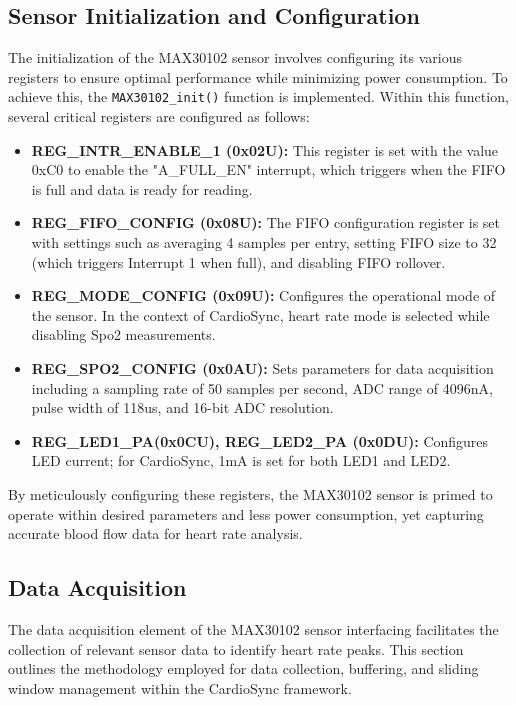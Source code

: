 \subsection{Sensor Initialization and Configuration}
\label{sec:sensor_config}
The initialization of the MAX30102 sensor involves configuring its various registers to ensure optimal performance while minimizing power consumption. To achieve this, the \texttt{MAX30102\_init()} function is implemented. Within this function, several critical registers are configured as follows:

\begin{itemize}
    \item \textbf{REG\_INTR\_ENABLE\_1 (0x02U):} This register is set with the value 0xC0 to enable the "A\_FULL\_EN" interrupt, which triggers when the FIFO is full and data is ready for reading.
    
    \item \textbf{REG\_FIFO\_CONFIG (0x08U):} The FIFO configuration register is set with settings such as averaging 4 samples per entry, setting FIFO size to 32 (which triggers Interrupt 1 when full), and disabling FIFO rollover.
    
    \item \textbf{REG\_MODE\_CONFIG (0x09U):} Configures the operational mode of the sensor. In the context of CardioSync, heart rate mode is selected while disabling Spo2 measurements.
    
    \item \textbf{REG\_SPO2\_CONFIG (0x0AU):} Sets parameters for data acquisition including a sampling rate of 50 samples per second, ADC range of 4096nA, pulse width of 118us, and 16-bit ADC resolution.
    
    \item \textbf{REG\_LED1\_PA(0x0CU), REG\_LED2\_PA (0x0DU):} Configures LED current; for CardioSync, 1mA is set for both LED1 and LED2.
\end{itemize}

\noindent By meticulously configuring these registers, the MAX30102 sensor is primed to operate within desired parameters and less power consumption, yet capturing accurate blood flow data for heart rate analysis.

\subsection{Data Acquisition}
\label{sec:sensor_data_impl}
The data acquisition element of the MAX30102 sensor interfacing facilitates the collection of relevant sensor data to identify heart rate peaks. This section outlines the methodology employed for data collection, buffering, and sliding window management within the CardioSync framework.

